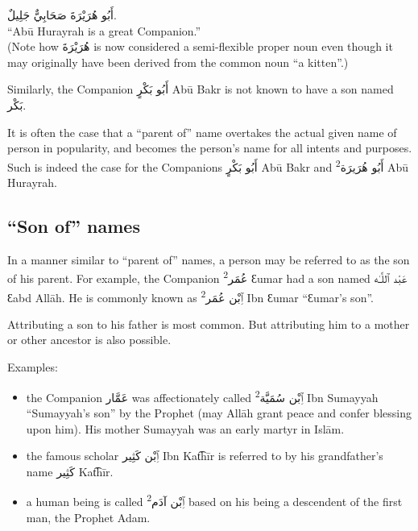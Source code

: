 \documentclass[
  10pt,
]{book}
\providecommand{\tightlist}{%
  \setlength{\itemsep}{0pt}\setlength{\parskip}{0pt}}
\begin{document}
\foreignlanguage{arabic}{أَبُو هُرَيْرَةَ صَحَابِيٌّ جَلِيلٌ.}\\
\enquote{Abū Hurayrah is a great Companion.}\\
(Note how \foreignlanguage{arabic}{هُرَيْرَةَ} is now considered a semi-flexible proper noun even though it may originally have been derived from the common noun \enquote{a kitten}.)

Similarly, the Companion \foreignlanguage{arabic}{أَبُو بَکْرٍ} Abū Bakr is not known to have a son named \foreignlanguage{arabic}{بَکْر}.

It is often the case that a \enquote{parent of} name overtakes the actual given name of person in popularity, and becomes the person's name for all intents and purposes. Such is indeed the case for the Companions
\foreignlanguage{arabic}{أَبُو بَکْرٍ} Abū Bakr
and
\textsuperscript{2}\foreignlanguage{arabic}{أَبُو هُرَيرَة}
Abū Hurayrah.

\subsection{\texorpdfstring{\enquote{Son of} names}{``Son of'' names}}\label{son-of-names}

In a manner similar to \enquote{parent of} names, a person may be referred to as the son of his parent. For example, the Companion \textsuperscript{2}\foreignlanguage{arabic}{عُمَر} Ɛumar had a son named
\foreignlanguage{arabic}{عَبْد ٱللَّـٰه} Ɛabd Allāh. He is commonly known as \textsuperscript{2}\foreignlanguage{arabic}{ٱِبْن عُمَر} Ibn Ɛumar \enquote{Ɛumar's son}.

Attributing a son to his father is most common. But attributing him to a mother or other ancestor is also possible.

Examples:

\begin{itemize}
\tightlist
\item
  the Companion \foreignlanguage{arabic}{عَمَّار} was affectionately called \textsuperscript{2}\foreignlanguage{arabic}{ٱِبْن سُمَيَّة} Ibn Sumayyah \enquote{Sumayyah's son} by the Prophet
  (may Allāh grant peace and confer blessing upon him). His mother Sumayyah was an early martyr in Islām.
\item
  the famous scholar \foreignlanguage{arabic}{ٱِبْن کَثِير} Ibn Kat͡hīr is referred to by his grandfather's name \foreignlanguage{arabic}{کَثِير} Kat͡hīr.
\item
  a human being is called \textsuperscript{2}\foreignlanguage{arabic}{ٱِبْن آدَم} based on his being a descendent of the first man, the Prophet Adam.
\end{itemize}
\end{document}
